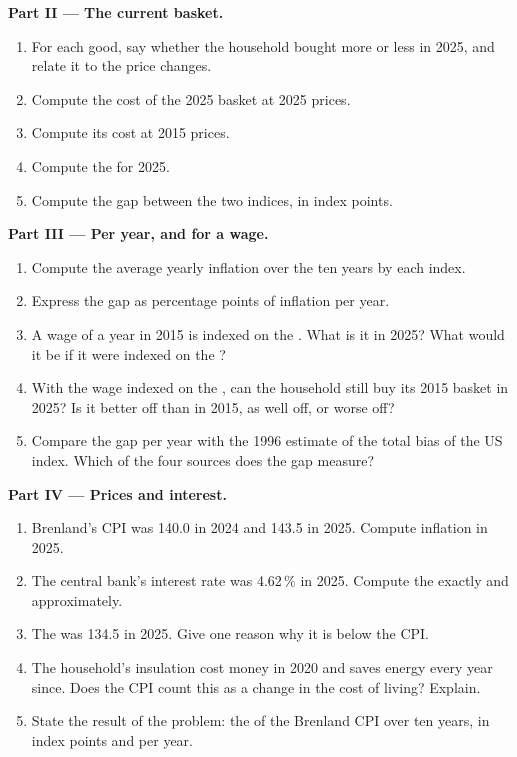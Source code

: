 \begin{problem}
\medskip
\noindent\textbf{Part II --- The current basket.}
\begin{enumerate}[resume]
\item For each good, say whether the household bought more or less in 2025, and relate it to the price changes.
\item Compute the cost of the 2025 basket at 2025 prices.
\item Compute its cost at 2015 prices.
\item Compute the  for 2025.
\item Compute the gap between the two indices, in index points.
\end{enumerate}

\medskip
\noindent\textbf{Part III --- Per year, and for a wage.}
\begin{enumerate}[resume]
\item Compute the average yearly inflation over the ten years by each index.
\item Express the gap as percentage points of inflation per year.
\item A wage of  a year in 2015 is indexed on the . What is it in 2025? What would it be if it were indexed on the ?
\item With the wage indexed on the , can the household still buy its 2015 basket in 2025? Is it better off than in 2015, as well off, or worse off?
\item Compare the gap per year with the 1996 estimate of the total bias of the US index. Which of the four sources does the gap measure?
\end{enumerate}

\medskip
\noindent\textbf{Part IV --- Prices and interest.}
\begin{enumerate}[resume]
\item Brenland's CPI was 140.0 in 2024 and 143.5 in 2025. Compute inflation in 2025.
\item The central bank's interest rate was 4.62\,\% in 2025. Compute the  exactly and approximately.
\item The  was 134.5 in 2025. Give one reason why it is below the CPI.
\item The household's insulation cost money in 2020 and saves energy every year since. Does the CPI count this as a change in the cost of living? Explain.
\item State the result of the problem: the  of the Brenland CPI over ten years, in index points and per year.
\end{enumerate}
\end{problem}
